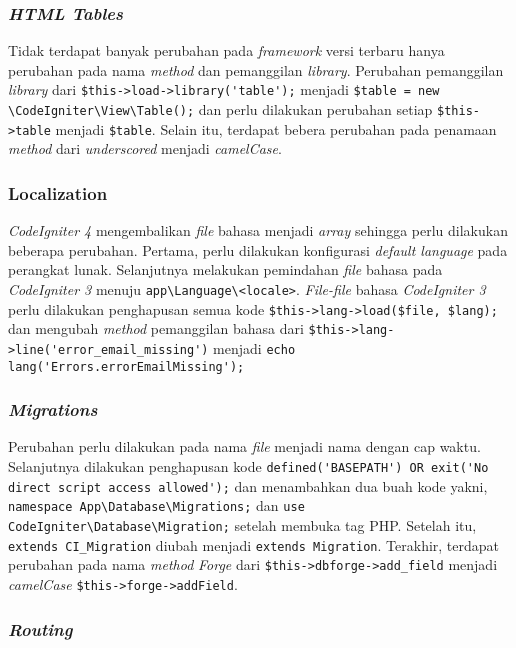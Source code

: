 \subsubsection{\textit{HTML Tables}}

Tidak terdapat banyak perubahan pada \textit{framework} versi terbaru hanya perubahan pada nama \textit{method} dan pemanggilan \textit{library}. Perubahan pemanggilan \textit{library} dari \verb|$this->load->library('table');| menjadi \verb|$table = new \CodeIgniter\View\Table();| dan perlu dilakukan perubahan setiap \verb|$this->table| menjadi \verb|$table|. Selain itu, terdapat bebera perubahan pada penamaan \textit{method} dari \textit{underscored} menjadi \textit{camelCase}.


\subsubsection{Localization}

\textit{CodeIgniter 4} mengembalikan \textit{file} bahasa menjadi \textit{array} sehingga perlu dilakukan beberapa perubahan. Pertama, perlu dilakukan konfigurasi \textit{default language} 
pada perangkat lunak. Selanjutnya melakukan pemindahan \textit{file} bahasa pada \textit{CodeIgniter 3} menuju \verb|app\Language\<locale>|. \textit{File-file} bahasa \textit{CodeIgniter 3} perlu dilakukan penghapusan semua kode \verb|$this->lang->load($file, $lang);| dan mengubah \textit{method} pemanggilan bahasa dari \verb|$this->lang->line('error_email_missing')| menjadi \verb|echo lang('Errors.errorEmailMissing');|
 
\subsubsection{\textit{Migrations}}

Perubahan perlu dilakukan pada nama \textit{file} menjadi nama dengan cap waktu. Selanjutnya dilakukan penghapusan kode \verb|defined('BASEPATH') OR exit('No direct script access allowed');| dan menambahkan dua buah kode yakni, \verb|namespace App\Database\Migrations;| dan \verb|use CodeIgniter\Database\Migration;| setelah membuka tag PHP. Setelah itu, \verb|extends CI_Migration| diubah menjadi \verb|extends Migration|. Terakhir, terdapat perubahan pada nama \textit{method} \textit{Forge} dari \verb|$this->dbforge->add_field| menjadi \textit{camelCase} \verb|$this->forge->addField|.

\subsubsection{\textit{Routing}}

